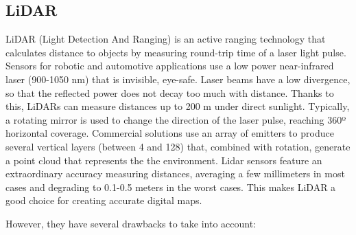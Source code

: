 \subsection{LiDAR}
LiDAR (Light Detection And Ranging) is an active ranging technology that 
calculates distance to objects by measuring round-trip time of a laser light 
pulse.
Sensors for robotic and automotive applications use a low power 
near-infrared laser (900-1050 nm) that is invisible, eye-safe. 
Laser beams have a low divergence, so that the reflected power does not decay 
too much with distance. Thanks to this, LiDARs can measure distances up to 
200 m under direct sunlight.
Typically, a rotating mirror is used to change the direction of the laser 
pulse, reaching 360º horizontal coverage. Commercial solutions use an array of 
emitters to produce several vertical layers (between 4 and 128) that, combined 
with rotation, generate a point cloud that represents the the environment.
Lidar sensors feature an extraordinary accuracy measuring distances, averaging
a few millimeters in most cases and degrading to 0.1-0.5 meters in the worst 
cases. This makes LiDAR a good choice for creating accurate digital maps.

However, they have several drawbacks to take into account:

